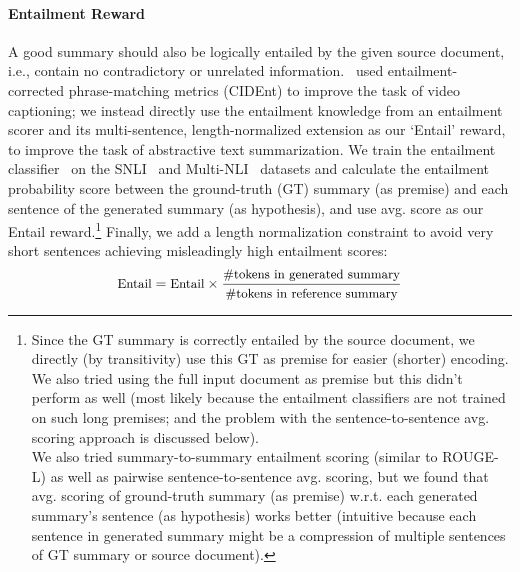 \documentclass[11pt,a4paper]{article}
\begin{document}
\paragraph{Entailment Reward}
\label{subsec:entailment-rewards}
A good summary should also be logically entailed by the given source document, i.e., contain no contradictory or unrelated information.~ used entailment-corrected phrase-matching metrics  (CIDEnt) to improve the task of video captioning; we instead directly use the entailment knowledge from an entailment scorer and its multi-sentence, length-normalized extension as our `Entail' reward, to improve the task of abstractive text summarization. We train the entailment classifier~\cite{parikh2016decomposable} on the SNLI~\cite{bowman2015large} and Multi-NLI~\cite{williams2017broad} datasets and calculate the entailment probability score between the ground-truth (GT) summary (as premise) and each sentence of the generated summary (as hypothesis), and use  avg. score as our Entail reward.\footnote{Since the GT summary is correctly entailed by the source document, we directly (by transitivity) use this GT as premise for easier (shorter) encoding. We also tried using the full input document as premise but this didn't perform as well (most likely because the entailment classifiers are not trained on such long premises; and the problem with the sentence-to-sentence avg. scoring approach is discussed below).\\
We also tried summary-to-summary entailment scoring (similar to ROUGE-L) as well as pairwise sentence-to-sentence avg. scoring, but we found that avg. scoring of ground-truth summary (as premise) w.r.t. each generated summary's sentence (as hypothesis) works better (intuitive because each sentence in generated summary might be a compression of multiple sentences of GT summary or source document).} Finally, we add a length normalization constraint to avoid very short sentences achieving misleadingly high entailment scores: 
\vspace{-5pt}
\begin{equation}
\begin{small}
\label{eq:ent-length-norm}
\text{Entail} = \text{Entail} \times \frac{\text{\#tokens in generated summary}}{\text{\#tokens in reference summary}}
\end{small}
\end{equation}
\end{document}
